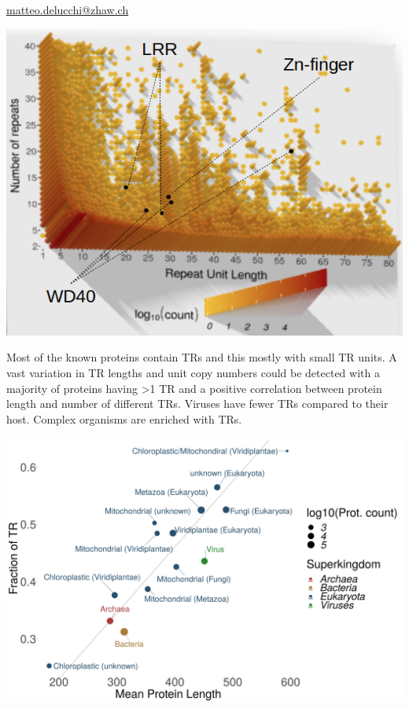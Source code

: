 \documentclass[widescreen,fleqn]{betterposter}
\begin{document}
{{\begin{minipage}[t]{\textwidth}
    \begin{center}
        {\fontsize{40}{50} \selectfont 
            \href{mailto:matteo.delucchi@zhaw.ch}{matteo.delucchi@zhaw.ch}
        }
    \end{center}
\end{minipage}

}

}{
}{

\begin{center}
    \includegraphics[width=0.35\textheight]{figures/fig1_3D_rotated.png}
\end{center}
Most of the known proteins contain TRs and this mostly with small TR units. A vast variation in TR lengths and unit copy numbers could be detected with a majority of proteins having >1 TR and a positive correlation between protein length and number of different TRs.
Viruses have fewer TRs compared to their host. Complex organisms are enriched with TRs.

\begin{center}
    \includegraphics[width=0.4\textheight]{figures/Mean_Prot_length_vs_Frac_TR.png}
\end{center}

}
\end{document}
